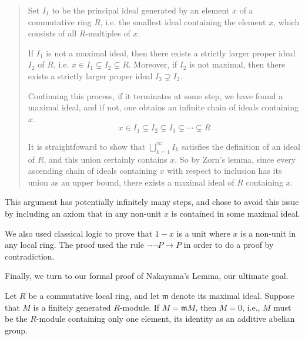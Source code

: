\documentclass{article}
\begin{document}
\begin{quote}
    Set \(I_{1}\) to be the principal ideal generated by an element \(x\) of a commutative ring $R$, i.e. the
    smallest ideal containing the element $x$, which consists of all $R$-multiples of $x$. 
   
    If \(I_{1}\) is not a maximal ideal,
    then there exists a strictly larger proper ideal \(I_{2}\) of $R$, i.e.
    $x\in I_{1}\subsetneq I_{2} \subsetneq R$.
    Moreover, if  \(I_{2}\) is not maximal, then there
    exists a strictly larger proper ideal $I_{3} \supsetneq I_2$.
    
    Continuing this process, if it terminates at some step, we have found a maximal ideal, and if not, 
    one obtains an infinite chain of
    ideals containing \(x\).
    \[x\in I_{1}\subsetneq I_{2}\subsetneq I_{3}\subsetneq\cdots\subsetneq R\]
    
    It is straightfoward to show that \(\bigcup_{k=1}^{\infty} I_{k}\) satisfies the definition of an ideal of $R$, 
    and this union certainly contains \(x\). So by Zorn's lemma, since every ascending chain of ideals containing $x$ 
    with respect to inclusion has its union as an upper bound, there exists a maximal
    ideal of \(R\) containing \(x\).
\end{quote}

This argument has potentially infinitely many steps, 
and chose to avoid this issue by including an axiom that in 
 any non-unit \(x\) is
contained in some maximal ideal. 


We also used classical logic to prove that \(1 - x\) is a unit where \(x\) is
a non-unit in any local ring. The proof used the rule \(\neg\neg P\rightarrow
P\) in order to do a proof by contradiction.



Finally, we turn to our formal proof of Nakayama's Lemma, our ultimate goal.

\begin{nak*}
Let $R$ be a commutative local ring, and let $\mathfrak{m}$ denote its maximal ideal. 
Suppose that $M$ is a finitely generated $R$-module. 
If $M = \mathfrak{m} M$, then $M = 0$, i.e., $M$ must be the $R$-module containing only one element, its identity as an additive abelian group. 
\end{nak*}
\end{document}

